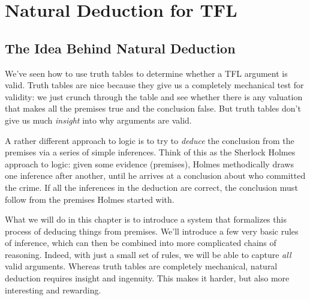 \chapter{Natural Deduction for TFL}\label{ch:NDTFL}

\section{The Idea Behind Natural Deduction}\label{s:NDVeryIdea}


We've seen how to use truth tables to determine whether a TFL argument is valid.  Truth tables are nice because they give us a completely mechanical test for validity: we just crunch through the table and see whether there is any valuation that makes all the premises true and the conclusion false.   But truth tables don't give us much \emph{insight} into why arguments are valid.

A rather different approach to logic is to try to \emph{deduce} the conclusion from the premises via a series of simple inferences.  Think of this as the Sherlock Holmes approach to logic: given some evidence (premises), Holmes methodically draws one inference after another, until he arrives at a conclusion about who committed the crime.  If all the inferences in the deduction are correct, the conclusion must follow from the premises Holmes started with.



What we will do in this chapter is to introduce a  system that formalizes this process of deducing things from premises. We'll introduce a few very basic rules of inference, which can then be combined into more complicated chains of reasoning. Indeed, with just a small set of rules, we will be able to capture \emph{all} valid arguments.   Whereas truth tables are completely mechanical, natural deduction requires insight and ingenuity.  This makes it harder, but also more interesting and rewarding.

